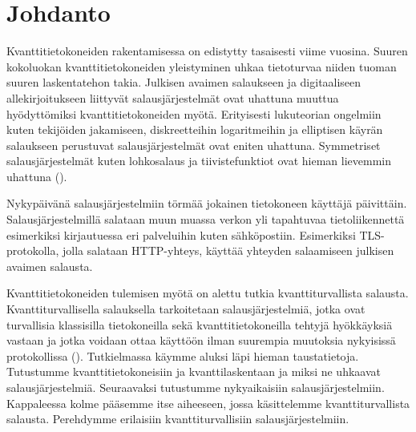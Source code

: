 \chapter{Johdanto\label{intro}}
Kvanttitietokoneiden rakentamisessa on edistytty tasaisesti viime vuosina. Suuren kokoluokan kvanttitietokoneiden yleistyminen uhkaa tietoturvaa niiden tuoman suuren laskentatehon takia. Julkisen avaimen salaukseen ja digitaaliseen allekirjoitukseen liittyvät salausjärjestelmät ovat uhattuna muuttua hyödyttömiksi kvanttitietokoneiden myötä. Erityisesti lukuteorian ongelmiin kuten tekijöiden jakamiseen, diskreetteihin logaritmeihin ja elliptisen käyrän salaukseen perustuvat salausjärjestelmät ovat eniten uhattuna. Symmetriset salausjärjestelmät kuten lohkosalaus ja tiivistefunktiot ovat hieman lievemmin uhattuna (\cite{alagic2020status}).

Nykypäivänä salausjärjestelmiin törmää jokainen tietokoneen käyttäjä päivittäin. Salausjärjestelmillä salataan muun muassa verkon yli tapahtuvaa tietoliikennettä esimerkiksi kirjautuessa eri palveluihin kuten sähköpostiin. Esimerkiksi TLS-protokolla, jolla salataan HTTP-yhteys, käyttää yhteyden salaamiseen julkisen avaimen salausta. 

Kvanttitietokoneiden tulemisen myötä on alettu tutkia kvanttiturvallista salausta. Kvanttiturvallisella salauksella tarkoitetaan salausjärjestelmiä, jotka ovat turvallisia klassisilla tietokoneilla sekä kvanttitietokoneilla tehtyjä hyökkäyksiä vastaan ja jotka voidaan ottaa käyttöön ilman suurempia muutoksia nykyisissä protokollissa (\cite{alagic2020status}). Tutkielmassa käymme aluksi läpi hieman taustatietoja. Tutustumme kvanttitietokoneisiin ja kvanttilaskentaan ja miksi ne uhkaavat salausjärjestelmiä. Seuraavaksi tutustumme nykyaikaisiin salausjärjestelmiin. Kappaleessa kolme pääsemme itse aiheeseen, jossa käsittelemme kvanttiturvallista salausta. Perehdymme erilaisiin kvanttiturvallisiin salausjärjestelmiin.